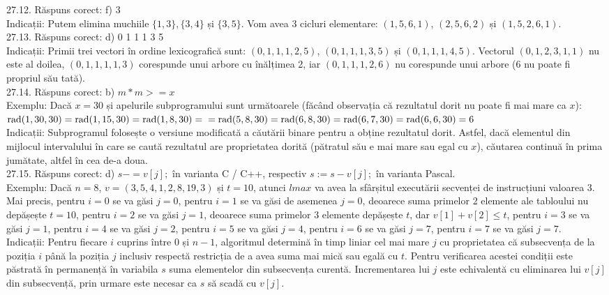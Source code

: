 27.12. Răspuns corect: f) 3\\
Indicații: Putem elimina muchiile $\{1,3\},\{3,4\}$ și $\{3,5\}$. Vom avea 3 cicluri elementare: $(1,5,6,1)$, $(2,5,6,2)$ și $(1,5,2,6,1)$.\\

27.13. Răspuns corect: d) 0 1 1 1 3 5\\
Indicații: Primii trei vectori în ordine lexicografică sunt: $(0,1,1,1,2,5)$, $(0,1,1,1,3,5)$ și $(0,1,1,1,4,5)$. Vectorul $(0,1,2,3,1,1)$ nu este al doilea, $(0,1,1,1,1,3)$ corespunde unui arbore cu înălțimea 2, iar $(0,1,1,1,2,6)$ nu corespunde unui arbore (6 nu poate fi propriul său tată).\\

27.14. Răspuns corect: b) $m * m>=x$\\
Exemplu: Dacă $x=30$ și apelurile subprogramului sunt următoarele (făcând observația că rezultatul dorit nu poate fi mai mare ca $x$):\\ $\operatorname{rad}(1,30,30)=\operatorname{rad}(1,15,30)=\operatorname{rad}(1,8,30)= \\ =\operatorname{rad}(5,8,30)=\operatorname{rad}(6,8,30)=\operatorname{rad}(6,7,30)=\operatorname{rad}(6,6,30)=6$\\ Indicații: Subprogramul folosește o versiune modificată a căutării binare pentru a obține rezultatul dorit. Astfel, dacă elementul din mijlocul intervalului în care se caută rezultatul are proprietatea dorită (pătratul său e mai mare sau egal cu $x$), căutarea continuă în prima jumătate, altfel în cea de-a doua.\\

27.15. Răspuns corect: d) $s-=v[j];$ în varianta C / C++, respectiv $s:=s-v[j];$ în varianta Pascal.\\
Exemplu: Dacă $n=8$, $v=(3,5,4,1,2,8,19,3)$ și $t=10$, atunci $lmax$ va avea la sfârșitul executării secvenței de instrucțiuni valoarea 3. Mai precis, pentru $i=0$ se va găsi $j=0$, pentru $i=1$ se va găsi de asemenea $j=0$, deoarece suma primelor 2 elemente ale tabloului nu depășește $t=10$, pentru $i=2$ se va găsi $j=1$, deoarece suma primelor 3 elemente depășește $t$, dar $v[1]+v[2] \leq t$, pentru $i=3$ se va găsi $j=1$, pentru $i=4$ se va găsi $j=2$, pentru $i=5$ se va găsi $j=4$, pentru $i=6$ se va găsi $j=7$, pentru $i=7$ se va găsi $j=7$.\\ Indicații: Pentru fiecare $i$ cuprins între 0 și $n-1$, algoritmul determină în timp liniar cel mai mare $j$ cu proprietatea că subsecvența de la poziția $i$ până la poziția $j$ inclusiv respectă restricția de a avea suma mai mică sau egală cu $t$. Pentru verificarea acestei condiții este păstrată în permanență în variabila $s$ suma elementelor din subsecvența curentă. Incrementarea lui $j$ este echivalentă cu eliminarea lui $v[j]$ din subsecvență, prin urmare este necesar ca $s$ să scadă cu $v[j]$.\\

